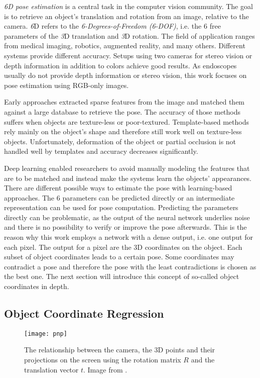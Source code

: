 \textit{6D pose estimation} is a central task in the computer vision community. The goal is to retrieve an object's translation and rotation from an image, relative to the camera. \textit{6}D refers to the \textit{6-Degrees-of-Freedom (6-DOF)}, i.e. the 6 free parameters of the \textit{3}D translation and \textit{3}D rotation. The field of application ranges from medical imaging, robotics, augmented reality, and many others. Different systems provide different accuracy. Setups using two cameras for stereo vision or depth information in addition to colors achieve good results. As endoscopes usually do not provide depth information or stereo vision, this work focuses on pose estimation using RGB-only images. 

Early approaches extracted sparse features from the image and matched them against a large database to retrieve the pose. The accuracy of those methods suffers when objects are texture-less or poor-textured. Template-based methods rely mainly on the object's shape and therefore still work well on texture-less objects. Unfortunately, deformation of the object or partial occlusion is not handled well by templates and accuracy decreases significantly.

Deep learning enabled researchers to avoid manually modeling the features that are to be matched and instead make the systems learn the objects' appearances. There are different possible ways to estimate the pose with learning-based approaches. The 6 parameters can be predicted directly or an intermediate representation can be used for pose computation. Predicting the parameters directly can be problematic, as the output of the neural network underlies noise and there is no possibility to verify or improve the pose afterwards. This is the reason why this work employs a network with a dense output, i.e. one output  for each pixel. The output for a pixel are the 3D coordinates on the object. Each subset of object coordinates leads to a certain pose. Some coordinates may contradict a pose and therefore the pose with the least contradictions is chosen as the best one. The next section will introduce this concept of so-called object coordinates in depth.

\subsection{Object Coordinate Regression} \label{objectcoordinates}

\begin{figure}[!tbp]
	\centering
    \texttt{[image: pnp]}
    \caption{The relationship between the camera, the 3D points and their projections on the screen using the rotation matrix $R$ and the translation vector $t$. Image from \cite{opencv_pnp}.}
    	\label{fig:pnp}
\end{figure} 

